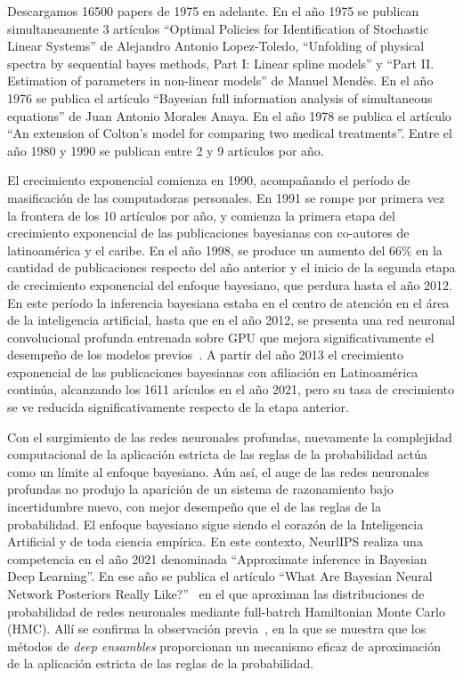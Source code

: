 \documentclass[a4paper,11pt]{book}
\theoremstyle{definition}
\begin{document}

Descargamos 16500 papers de 1975 en adelante.
%
En el a\~no 1975 se publican simultaneamente 3 art\'iculos ``Optimal Policies for Identification of Stochastic Linear Systems'' de Alejandro Antonio Lopez-Toledo, ``Unfolding of physical spectra by sequential bayes methods, Part I: Linear spline models'' y ``Part II. Estimation of parameters in non-linear models'' de Manuel Mend\`es.
%
En el a\~no 1976 se publica el art\'iculo ``Bayesian full information analysis of simultaneous equations'' de Juan Antonio Morales Anaya.
%
En el a\~no 1978 se publica el art\'iculo ``An extension of Colton's model for comparing two medical treatments''.
%
Entre el a\~no 1980 y 1990 se publican entre 2 y 9 art\'iculos por a\~no.


El crecimiento exponencial comienza en 1990, acompa\~nando el per\'iodo de masificaci\'on de las computadoras personales.
%
En 1991 se rompe por primera vez la frontera de los 10 art\'iculos por a\~no, y comienza la primera etapa del crecimiento exponencial de las publicaciones bayesianas con co-autores de latinoam\'erica y el caribe.
%
En el a\~no 1998, se produce un aumento del 66\% en la cantidad de publicaciones respecto del a\~no anterior y el inicio de la segunda etapa de crecimiento exponencial del enfoque bayesiano, que perdura hasta el a\~no 2012.
%
En este per\'iodo la inferencia bayesiana estaba en el centro de atenci\'on en el \'area de la inteligencia artificial, hasta que en el a\~no 2012, se presenta una red neuronal convolucional profunda entrenada sobre GPU que mejora significativamente el desempe\~no de los modelos previos~\cite{Krizhevsky2012}.
%
A partir del a\~no 2013 el crecimiento exponencial de las publicaciones bayesianas con afiliaci\'on en Latinoam\'erica contin\'ua, alcanzando los 1611 ar\'iculos en el a\~no 2021, pero su tasa de crecimiento se ve reducida significativamente respecto de la etapa anterior.


Con el surgimiento de las redes neuronales profundas, nuevamente la complejidad computacional de la aplicaci\'on estricta de las reglas de la probabilidad act\'ua como un l\'imite al enfoque bayesiano.
%
A\'un as\'i, el auge de las redes neuronales profundas no produjo la aparici\'on de un sistema de razonamiento bajo incertidumbre nuevo, con mejor desempe\~no que el de las reglas de la probabilidad.
%
El enfoque bayesiano sigue siendo el coraz\'on de la Inteligencia Artificial y de toda ciencia emp\'irica.
%
En este contexto, NeurlIPS realiza una competencia en el a\~no 2021 denominada ``Approximate inference in Bayesian Deep Learning''.
%
En ese a\~no se publica el art\'iculo ``What Are Bayesian Neural Network Posteriors Really Like?''~\cite{Izmailov2021} en el que aproximan las distribuciones de probabilidad de redes neuronales mediante full-batrch Hamiltonian Monte Carlo (HMC).
%
All\'i se confirma la observaci\'on previa~\cite{Wilson2020}, en la que se muestra que los m\'etodos de \emph{deep ensambles} proporcionan un mecanismo eficaz de aproximaci\'on de la aplicaci\'on estricta de las reglas de la probabilidad.
\end{document}
